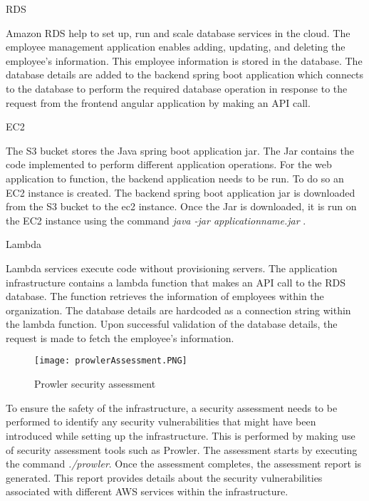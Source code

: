 \hfill \break

\par RDS

\par Amazon RDS help to set up, run and scale database services in the cloud.
The employee management application enables adding, updating, and deleting the employee’s information.
This employee information is stored in the database.
The database details are added to the backend spring boot application which connects to the database to perform the required database operation in response to the request from the frontend angular application by making an API call.

\hfill \break
\par EC2

\par The S3 bucket stores the Java spring boot application jar.
The Jar contains the code implemented to perform different application operations.
For the web application to function, the backend application needs to be run.
To do so an EC2 instance is created.
The backend spring boot application jar is downloaded from the S3 bucket to the ec2 instance.
Once the Jar is downloaded, it is run on the EC2 instance
using the command \textit{java -jar applicationname.jar} 
\cite{78}.

\hfill \break
\par Lambda

\par Lambda services execute code without provisioning servers.
The application infrastructure contains a lambda function that makes an API call to the RDS database.
The function retrieves the information of employees within the organization.
The database details are hardcoded as a connection string within the lambda function.
Upon successful validation of the database details, the request is made to fetch the employee’s information.
\begin{figure}
    \centering
    \texttt{[image: prowlerAssessment.PNG]}
    \caption{Prowler security assessment}
    \label{fig:prowlerassessmentreport}
\end{figure}
\par To ensure the safety of the infrastructure, a security assessment needs to be performed to identify any security vulnerabilities that might have been introduced while setting up the infrastructure. This is performed by making use of security assessment tools such as Prowler. The assessment starts by executing the command \textit{./prowler}. Once the assessment completes, the assessment report is generated. This report provides details about the security vulnerabilities associated with different AWS services within the infrastructure.


